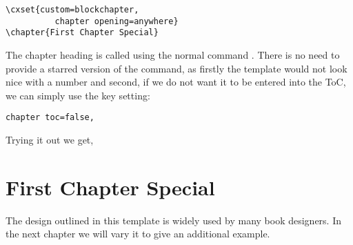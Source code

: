 \begin{verbatim}
\cxset{custom=blockchapter,
          chapter opening=anywhere}
\chapter{First Chapter Special}
\end{verbatim}

The chapter heading is called using the normal \latexe command \cmd{\chapter}. There is no need to provide a starred version of the command, as firstly the template would not look nice with a number and second, if we do not want it to be entered into the ToC, we can simply use the key setting:

\begin{verbatim}
chapter toc=false,
\end{verbatim}

Trying it out we get,



\chapter{First Chapter Special}

\makeatletter
\@specialfalse
\makeatother

The design outlined in this template is widely used by many book designers. In the next chapter we will vary it to 
give an additional example.







